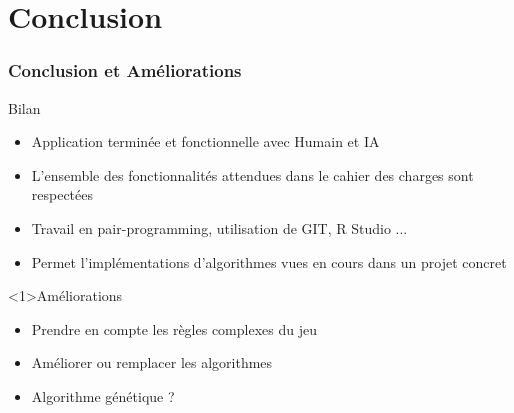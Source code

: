 \section{Conclusion}
	\begin{frame}
		\frametitle{Conclusion et Améliorations}
		\begin{block}{Bilan}
			\begin{itemize}
				\item Application terminée et fonctionnelle avec Humain et IA
				\item L'ensemble des fonctionnalités attendues dans le cahier des charges sont respectées
				\item Travail en pair-programming, utilisation de GIT, R Studio ...
				\item Permet l'implémentations d'algorithmes vues en cours dans un projet concret
			\end{itemize}
		\end{block}	
		\begin{block}<1>{Améliorations}
			\begin{itemize}
				\item Prendre en compte les règles complexes du jeu
				\item Améliorer ou remplacer les algorithmes
				\item Algorithme génétique ?
			\end{itemize}
		\end{block}	
\end{frame}